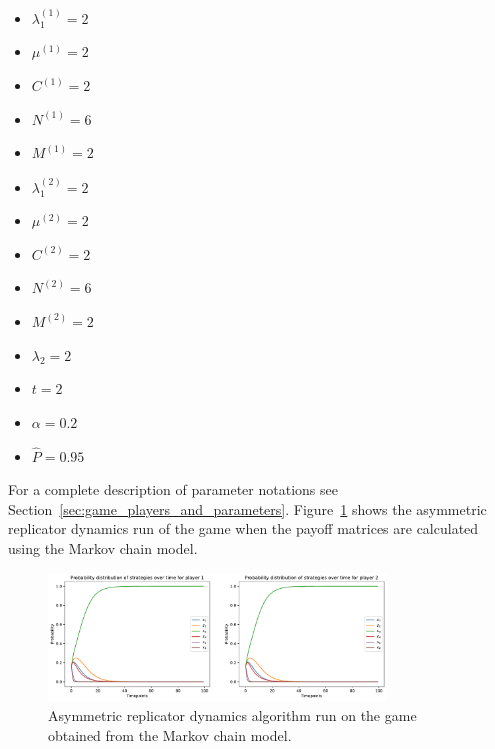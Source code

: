 \begin{multicols}{3}
    \begin{itemize}
        \item \( \lambda_1^{(1)} = 2 \)
        \item \( \mu^{(1)} = 2 \)
        \item \( C^{(1)} = 2 \)
        \item \( N^{(1)} = 6 \)
        \item \( M^{(1)} = 2 \)

        \columnbreak
        \item \( \lambda_1^{(2)} = 2 \)
        \item \( \mu^{(2)} = 2 \)
        \item \( C^{(2)} = 2 \)
        \item \( N^{(2)} = 6 \)
        \item \( M^{(2)} = 2 \)

        \columnbreak
        \item \( \lambda_2 = 2 \)
        \item \( t = 2 \)
        \item \( \alpha = 0.2 \)
        \item \( \hat{P} = 0.95 \)
    \end{itemize}    
\end{multicols}

For a complete description of parameter notations see
Section~\ref{sec:game_players_and_parameters}.
Figure~\ref{fig:game_des_markov_baseline} shows the asymmetric replicator
dynamics run of the game when the payoff matrices are calculated using the
Markov chain model.

\begin{figure}[ht]
    \centering
    \includegraphics[width=0.8\textwidth]{chapters/06_agent_based_extension/Bin/game_model_with_des/game_markov_baseline.pdf}
    \caption{Asymmetric replicator dynamics algorithm run on the game obtained
    from the Markov chain model.}
    \label{fig:game_des_markov_baseline}
\end{figure}

